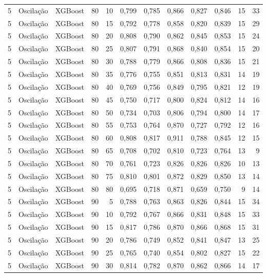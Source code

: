 \begin{longtable}{ccclrrrrrrrr}
5 & Oscilação & XGBoost & 80 & 10 & 0,799 & 0,785 & 0,866 & 0,827 & 0,846 & 15 & 33 \\
5 & Oscilação & XGBoost & 80 & 15 & 0,792 & 0,778 & 0,858 & 0,820 & 0,839 & 15 & 29 \\
5 & Oscilação & XGBoost & 80 & 20 & 0,808 & 0,790 & 0,862 & 0,845 & 0,853 & 15 & 24 \\
5 & Oscilação & XGBoost & 80 & 25 & 0,807 & 0,791 & 0,868 & 0,840 & 0,854 & 15 & 20 \\
5 & Oscilação & XGBoost & 80 & 30 & 0,788 & 0,779 & 0,866 & 0,808 & 0,836 & 15 & 21 \\
5 & Oscilação & XGBoost & 80 & 35 & 0,776 & 0,755 & 0,851 & 0,813 & 0,831 & 14 & 19 \\
5 & Oscilação & XGBoost & 80 & 40 & 0,769 & 0,756 & 0,849 & 0,795 & 0,821 & 12 & 19 \\
5 & Oscilação & XGBoost & 80 & 45 & 0,750 & 0,717 & 0,800 & 0,824 & 0,812 & 14 & 16 \\
5 & Oscilação & XGBoost & 80 & 50 & 0,734 & 0,703 & 0,806 & 0,794 & 0,800 & 14 & 17 \\
5 & Oscilação & XGBoost & 80 & 55 & 0,753 & 0,764 & 0,870 & 0,727 & 0,792 & 12 & 16 \\
5 & Oscilação & XGBoost & 80 & 60 & 0,808 & 0,817 & 0,911 & 0,788 & 0,845 & 12 & 15 \\
5 & Oscilação & XGBoost & 80 & 65 & 0,708 & 0,702 & 0,810 & 0,723 & 0,764 & 13 & 9 \\
5 & Oscilação & XGBoost & 80 & 70 & 0,761 & 0,723 & 0,826 & 0,826 & 0,826 & 10 & 13 \\
5 & Oscilação & XGBoost & 80 & 75 & 0,810 & 0,801 & 0,872 & 0,829 & 0,850 & 13 & 14 \\
5 & Oscilação & XGBoost & 80 & 80 & 0,695 & 0,718 & 0,871 & 0,659 & 0,750 & 9 & 14 \\
5 & Oscilação & XGBoost & 90 & 5 & 0,788 & 0,763 & 0,863 & 0,826 & 0,844 & 15 & 34 \\
5 & Oscilação & XGBoost & 90 & 10 & 0,792 & 0,767 & 0,866 & 0,831 & 0,848 & 15 & 33 \\
5 & Oscilação & XGBoost & 90 & 15 & 0,817 & 0,786 & 0,870 & 0,866 & 0,868 & 15 & 31 \\
5 & Oscilação & XGBoost & 90 & 20 & 0,786 & 0,749 & 0,852 & 0,841 & 0,847 & 13 & 25 \\
5 & Oscilação & XGBoost & 90 & 25 & 0,765 & 0,740 & 0,854 & 0,802 & 0,827 & 15 & 22 \\
5 & Oscilação & XGBoost & 90 & 30 & 0,814 & 0,782 & 0,870 & 0,862 & 0,866 & 14 & 17 \\

\end{longtable}
